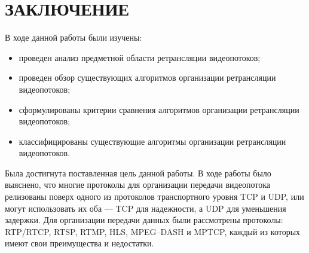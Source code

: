 \chapter*{ЗАКЛЮЧЕНИЕ}

В ходе данной работы были изучены:
\begin{itemize}
	\item проведен анализ предметной области ретрансляции видеопотоков;
	\item проведен обзор существующих алгоритмов организации ретрансляции видеопотоков;
	\item сформулированы критерии сравнения алгоритмов организации ретрансляции видеопотоков;
	\item классифицированы существующие алгоритмы организации ретрансляции видеопотоков.  
\end{itemize}

Была достигнута поставленная цель данной работы. В ходе работы было выяснено, что многие протоколы для организации передачи видеопотока релизованы поверх одного из протоколов транспортного уровня TCP и UDP, или могут использовать их оба --- TCP для надежности, а UDP для уменьшения задержки. Для организации передачи данных были рассмотрены протоколы: RTP/RTCP, RTSP, RTMP, HLS, MPEG--DASH и MPTCP, каждый из которых имеют свои преимущества и недостатки.



